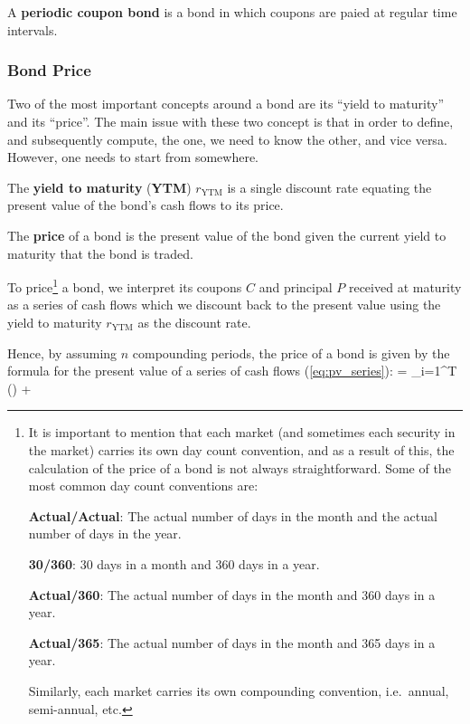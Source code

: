 A \textbf{periodic coupon bond} is a bond in which coupons are paied at regular time intervals.
\ed

\subsubsection{Bond Price}

Two of the most important concepts around a bond are its ``yield to maturity'' and its ``price''. The main issue with
these two concept is that in order to define, and subsequently compute, the one, we need to know the other, and vice
versa. However, one needs to start from somewhere.

The \textbf{yield to maturity} (\textbf{YTM}) $r_{\text{YTM}}$ is a single discount rate equating the present value of
the bond's cash flows to its price.
\ed

The \textbf{price} of a bond is the present value of the bond given the current yield to maturity that the bond is
traded.
\ed

To price\footnote{It is important to mention that each market (and sometimes each security in the market) carries its
own day count convention, and as a result of this, the calculation of the price of a bond is not always straightforward.
Some of the most common day count conventions are:
\bit
\item \textbf{Actual/Actual}: The actual number of days in the month and the actual number of days in the year.
\item \textbf{30/360}: 30 days in a month and 360 days in a year.
\item \textbf{Actual/360}: The actual number of days in the month and 360 days in a year.
\item \textbf{Actual/365}: The actual number of days in the month and 365 days in a year.
\eit

Similarly, each market carries its own compounding convention, i.e.\ annual, semi-annual, etc.} a bond, we interpret
its coupons $C$ and principal $P$ received at maturity as a series of cash flows which we discount back to the present
value using the yield to maturity $r_{\text{YTM}}$ as the discount rate.


Hence, by assuming $n$ compounding periods, the price of a bond is given by the formula for the present value of a
series of cash flows (\ref{eq:pv_series}):
\bse
{} = \sum_{i=1}^T \Bigg(\Bigg) +
\ese

